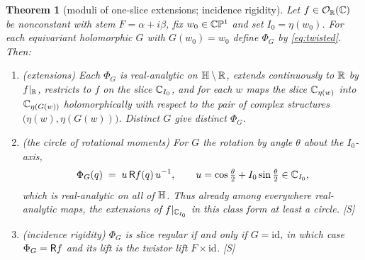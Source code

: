 \documentclass[11pt]{amsart}
\newtheorem{theorem}{Theorem}[section]
\theoremstyle{definition}
\theoremstyle{remark}
\begin{document}
\begin{theorem}[moduli of one-slice extensions; incidence
rigidity]\label{thm:twistormoduli}
Let $f\in\mathcal{O}_{\mathbb{R}}(\mathbb{C})$ be nonconstant with stem $F=\alpha+i\beta$, fix
$w_0\in\mathbb{C}\mathbb{P}^1$ and set $I_0=\eta(w_0)$.  For each equivariant
holomorphic $G$ with $G(w_0)=w_0$ define $\Phi_G$ by \eqref{eq:twisted}.
Then:
\begin{enumerate}
\item \textup{(extensions)} Each $\Phi_G$ is real-analytic on
$\mathbb{H}\setminus\mathbb{R}$, extends continuously to $\mathbb{R}$ by $f|_{\mathbb{R}}$, restricts
to $f$ on the slice $\mathbb{C}_{I_0}$, and for each $w$ maps the slice
$\mathbb{C}_{\eta(w)}$ into $\mathbb{C}_{\eta(G(w))}$ holomorphically with respect to
the pair of complex structures $\bigl(\eta(w),\eta(G(w))\bigr)$.
Distinct $G$ give distinct $\Phi_G$.
\item \textup{(the circle of rotational moments)}  For $G$ the rotation
by angle $\theta$ about the $I_0$-axis,
\[
\Phi_G(q)\;=\;u\,\mathsf{R} f(q)\,u^{-1},
\qquad u=\cos\tfrac\theta2+I_0\sin\tfrac\theta2\in\mathbb{C}_{I_0},
\]
which is real-analytic on all of $\mathbb{H}$.  Thus already among everywhere
real-analytic maps, the extensions of $f|_{\mathbb{C}_{I_0}}$ in this class form
at least a circle.  \textup{[S]}
\item \textup{(incidence rigidity)}  $\Phi_G$ is slice regular if and
only if $G=\mathrm{id}$, in which case $\Phi_G=\mathsf{R} f$ and its lift is
the twistor lift $F\times\mathrm{id}$.  \textup{[S]}
\end{enumerate}
\end{theorem}
\end{document}
